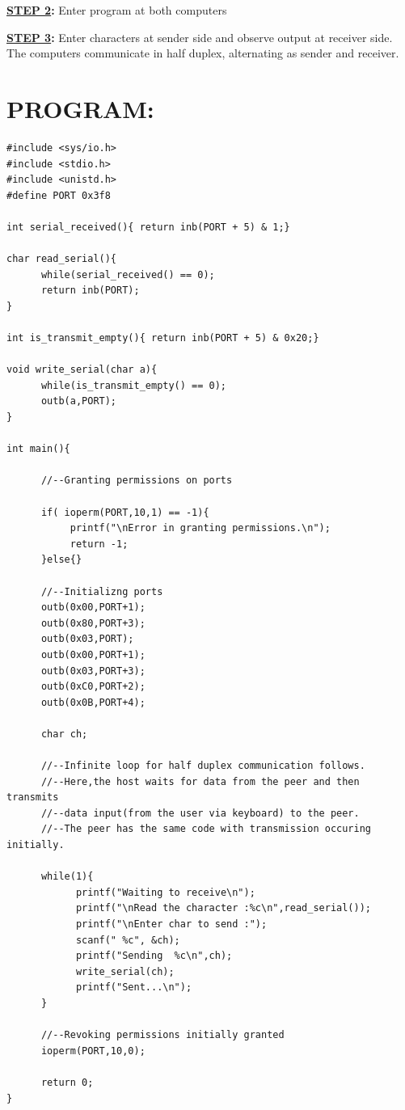 \documentclass[a4paper,28pt]{report}
\begin{document}
\textbf{\underline{STEP 2}:} Enter program at both computers

\textbf{\underline{STEP 3}:} Enter characters at sender side and observe output at receiver side. The computers  \hspace*{48pt}communicate in half duplex, alternating as sender and receiver.

\section*{PROGRAM:}
\begin{lstlisting}
#include <sys/io.h>
#include <stdio.h>
#include <unistd.h>
#define PORT 0x3f8

int serial_received(){ return inb(PORT + 5) & 1;}

char read_serial(){
      while(serial_received() == 0);
      return inb(PORT);
}

int is_transmit_empty(){ return inb(PORT + 5) & 0x20;}

void write_serial(char a){
      while(is_transmit_empty() == 0);
      outb(a,PORT);
}

int main(){

      //--Granting permissions on ports
      
      if( ioperm(PORT,10,1) == -1){
           printf("\nError in granting permissions.\n");
           return -1;
      }else{}
      
      //--Initializng ports
      outb(0x00,PORT+1);
      outb(0x80,PORT+3);
      outb(0x03,PORT);
      outb(0x00,PORT+1);
      outb(0x03,PORT+3);
      outb(0xC0,PORT+2);
      outb(0x0B,PORT+4);
      
      char ch;
      
      //--Infinite loop for half duplex communication follows.
      //--Here,the host waits for data from the peer and then transmits
      //--data input(from the user via keyboard) to the peer.
      //--The peer has the same code with transmission occuring initially.
      
      while(1){
            printf("Waiting to receive\n");
            printf("\nRead the character :%c\n",read_serial());
            printf("\nEnter char to send :");
            scanf(" %c", &ch);
            printf("Sending  %c\n",ch);
            write_serial(ch);
            printf("Sent...\n");
      }
      
      //--Revoking permissions initially granted
      ioperm(PORT,10,0);
      
      return 0;
}
\end{lstlisting}
\end{document}
